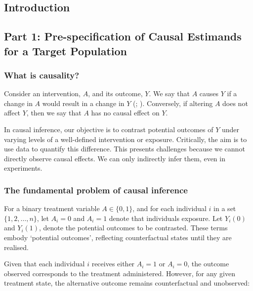 \documentclass[
  singlecolumn]{article}
\begin{document}
\subsection{Introduction}\label{introduction}

\subsection{Part 1: Pre-specification of Causal Estimands for a Target
Population}\label{part-1-pre-specification-of-causal-estimands-for-a-target-population}

\subsubsection{What is causality?}\label{what-is-causality}

Consider an intervention, \(A\), and its outcome, \(Y\). We say that
\(A\) causes \(Y\) if a change in \(A\) would result in a change in
\(Y\) (;
). Conversely, if altering \(A\)
does not affect \(Y\), then we say that \(A\) has no causal effect on
\(Y\).

In causal inference, our objective is to contrast potential outcomes of
\(Y\) under varying levels of a well-defined intervention or exposure.
Critically, the aim is to use data to quantify this difference. This
presents challenges because we cannot directly observe causal effects.
We can only indirectly infer them, even in experiments.

\subsubsection{The fundamental problem of causal
inference}\label{the-fundamental-problem-of-causal-inference}

For a binary treatment variable \(A \in \{0,1\}\), and for each
individual \(i\) in a set \(\{1, 2, \ldots, n\}\), let \(A_i = 0\) and
\(A_i = 1\) denote that individuals exposure. Let \(Y_i(0)\) and
\(Y_i(1)\), denote the potential outcomes to be contrasted. These terms
embody `potential outcomes', reflecting counterfactual states until they
are realised.

Given that each individual \(i\) receives either \(A_i = 1\) or
\(A_i = 0\), the outcome observed corresponds to the treatment
administered. However, for any given treatment state, the alternative
outcome remains counterfactual and unobserved:
\end{document}
